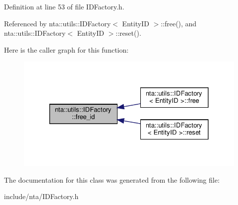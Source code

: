 Definition at line 53 of file I\+D\+Factory.\+h.



Referenced by nta\+::utils\+::\+I\+D\+Factory$<$ Entity\+I\+D $>$\+::free(), and nta\+::utils\+::\+I\+D\+Factory$<$ Entity\+I\+D $>$\+::reset().

Here is the caller graph for this function\+:\nopagebreak
\begin{figure}[H]
\begin{center}
\leavevmode
\includegraphics[width=324pt]{d6/d62/classnta_1_1utils_1_1IDFactory_ac136bf7941dcdc20ed51c680aaf4a369_icgraph}
\end{center}
\end{figure}


The documentation for this class was generated from the following file\+:\begin{DoxyCompactItemize}
\item 
include/nta/I\+D\+Factory.\+h\end{DoxyCompactItemize}
